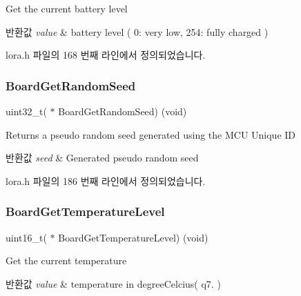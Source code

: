 Get the current battery level 


\begin{DoxyRetVals}{반환값}
{\em value} & battery level ( 0\+: very low, 254\+: fully charged ) \\
\hline
\end{DoxyRetVals}


lora.\+h 파일의 168 번째 라인에서 정의되었습니다.

\mbox{\label{structs_lo_ra_main_callback_a37eb88e46a53c5b95593370b046fd9c0}} 
\subsubsection{\texorpdfstring{Board\+Get\+Random\+Seed}{BoardGetRandomSeed}}
{\footnotesize\ttfamily uint32\+\_\+t( $\ast$ Board\+Get\+Random\+Seed) (void)}

Returns a pseudo random seed generated using the M\+CU Unique ID


\begin{DoxyRetVals}{반환값}
{\em seed} & Generated pseudo random seed \\
\hline
\end{DoxyRetVals}


lora.\+h 파일의 186 번째 라인에서 정의되었습니다.

\mbox{\label{structs_lo_ra_main_callback_a58bad07f3a00abe8a00ae1f25f6ab596}} 
\subsubsection{\texorpdfstring{Board\+Get\+Temperature\+Level}{BoardGetTemperatureLevel}}
{\footnotesize\ttfamily uint16\+\_\+t( $\ast$ Board\+Get\+Temperature\+Level) (void)}



Get the current temperature 


\begin{DoxyRetVals}{반환값}
{\em value} & temperature in degree\+Celcius( q7. ) \\
\hline
\end{DoxyRetVals}


